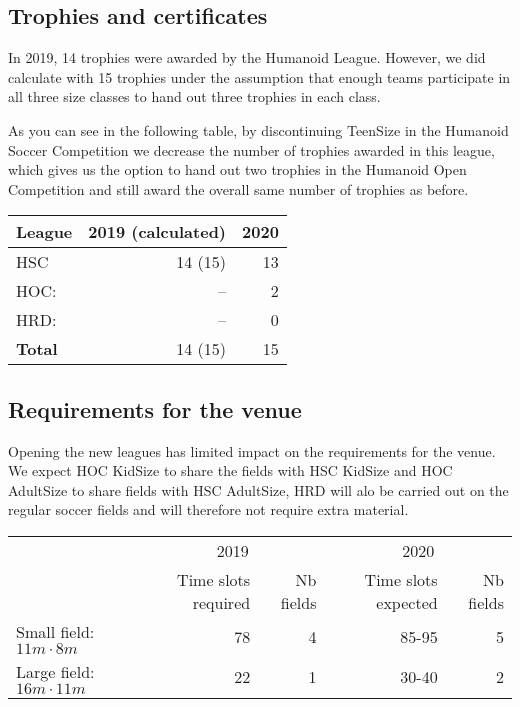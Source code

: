 \documentclass{article}
\begin{document}
\subsection{Trophies and certificates}

In 2019, 14 trophies were awarded by the Humanoid League. However, we did calculate with 15 trophies under the assumption that enough teams participate in all three size classes to hand out three trophies in each class. 

As you can see in the following table, by discontinuing TeenSize in the Humanoid Soccer Competition we decrease the number of trophies awarded in this league, which gives us the option to hand out two trophies in the Humanoid Open Competition and still award the overall same number of trophies as before.

\begin{table}[h]
  \centering
  \begin{tabular}{l | r | r}
    League & 2019 (calculated) & 2020\\
    \hline
    HSC & 14 (15) & 13\\ 
    HOC: & -- & 2\\ 
    HRD: & -- & 0\\
    \hline
    \textbf{Total} & 14 (15) & 15
  \end{tabular}
\end{table}



\subsection{Requirements for the venue}

Opening the new leagues has limited impact on the requirements for the venue.
We expect HOC KidSize to share the fields with HSC KidSize and HOC AdultSize to share fields with HSC AdultSize,
HRD will alo be carried out on the regular soccer fields and will therefore not require
extra material.


\begin{table}[h]
  \centering
  \begin{tabular}{l|r|r|r|r|}
    & \multicolumn{2}{c}{2019} & \multicolumn{2}{c}{2020}\\
    & Time slots required & Nb fields & Time slots expected & Nb fields\\
    \hline
    Small field: $11m \cdot 8m$ & 78 & 4 & 85-95 & 5\\
    Large field: $16m \cdot 11m$ & 22 & 1 & 30-40 & 2\\
  \end{tabular}
\end{table}
\end{document}
